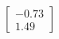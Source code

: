 \documentclass[preview]{standalone}
\begin{document}
\begin{align*}
\begin{bmatrix} -0.73 \\ 1.49 \end{bmatrix}
\end{align*}
\end{document}
